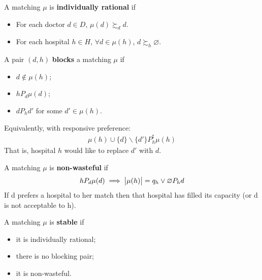\documentclass{article}
\begin{document}
	\begin{definition}
		A matching $\mu$ is \textbf{individually rational} if
		\begin{itemize}
			\item For each doctor $d \in D$, $\mu(d) \succsim_d d$.
			\item For each hospital $h \in H$, $\forall d \in \mu(h)$, $d \succsim_h \varnothing$.
		\end{itemize}
	\end{definition}
	
	\begin{definition}
		A pair $(d, h)$ \textbf{blocks} a matching $\mu$ if
		\begin{itemize}
			\item $d \notin \mu(h)$;
			\item $h P_d \mu(d)$;
			\item $d P_h d'$ for some $d' \in \mu(h)$.
		\end{itemize}
		Equivalently, with responsive preference:
		\begin{align}
			\mu(h) \cup \{d\} \backslash \{d'\} P_h^\sharp \mu(h)
		\end{align}
		That is, hospital $h$ would like to replace $d'$ with $d$.
	\end{definition}
	
	\begin{definition}
		A matching $\mu$ is \textbf{non-wasteful} if
		\begin{align}
			h P_d \mu(d) \implies \big \vert {\mu(h)} \big \vert = q_h \lor \varnothing P_h d
		\end{align}
		If d prefers a hospital to her match then that hospital has filled its capacity (or d is not acceptable to h).
	\end{definition}
	
	\begin{definition}
		A matching $\mu$ is \textbf{stable} if
		\begin{itemize}
			\item it is individually rational;
			\item there is no blocking pair;
			\item it is non-wasteful.
		\end{itemize}
	\end{definition}
	
\end{document}
